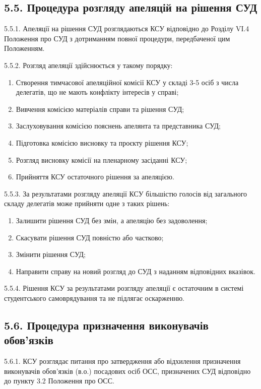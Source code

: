 \subsection*{5.5. Процедура розгляду апеляцій на рішення СУД}
    5.5.1. Апеляції на рішення СУД розглядаються КСУ відповідно до Розділу VI.4 Положення про СУД з дотриманням повної процедури, передбаченої цим Положенням.

    5.5.2. Розгляд апеляції здійснюється у такому порядку:

        \begin{enumerate}[label=\alph*)]
            \item Створення тимчасової апеляційної комісії КСУ у складі 3-5 осіб з числа делегатів, що не мають конфлікту інтересів у справі;
            \item Вивчення комісією матеріалів справи та рішення СУД;
            \item Заслуховування комісією пояснень апелянта та представника СУД;
            \item Підготовка комісією висновку та проєкту рішення КСУ;
            \item Розгляд висновку комісії на пленарному засіданні КСУ;
            \item Прийняття КСУ остаточного рішення за апеляцією.
        \end{enumerate}

    5.5.3. За результатами розгляду апеляції КСУ більшістю голосів від загального складу делегатів може прийняти одне з таких рішень:

        \begin{enumerate}[label=\alph*)]
            \item Залишити рішення СУД без змін, а апеляцію без задоволення;
            \item Скасувати рішення СУД повністю або частково;
            \item Змінити рішення СУД;
            \item Направити справу на новий розгляд до СУД з наданням відповідних вказівок.
        \end{enumerate}

    5.5.4. Рішення КСУ за результатами розгляду апеляції є остаточним в системі студентського самоврядування та не підлягає оскарженню.

\subsection*{5.6. Процедура призначення виконувачів обов'язків}
    5.6.1. КСУ розглядає питання про затвердження або відхилення призначення виконувачів обов'язків (в.о.) посадових осіб ОСС, призначених СУД відповідно до пункту 3.2 Положення про ОСС.

